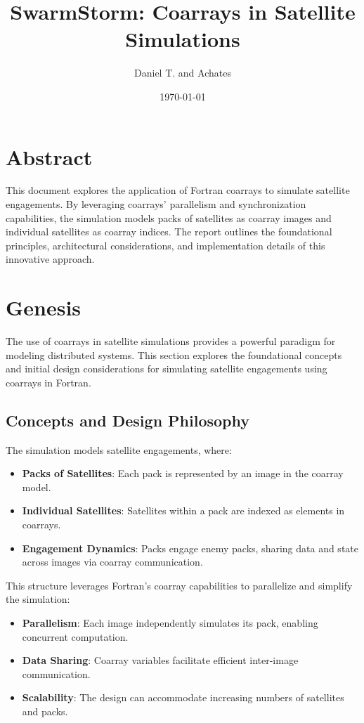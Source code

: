 \documentclass{article}
\title{SwarmStorm: Coarrays in Satellite Simulations}
\author{Daniel T. and Achates}
\date{\today}
\begin{document}
\maketitle

\section*{Abstract}
This document explores the application of Fortran coarrays to simulate satellite engagements. By leveraging coarrays' parallelism and synchronization capabilities, the simulation models packs of satellites as coarray images and individual satellites as coarray indices. The report outlines the foundational principles, architectural considerations, and implementation details of this innovative approach.

\section{Genesis}

The use of coarrays in satellite simulations provides a powerful paradigm for modeling distributed systems. This section explores the foundational concepts and initial design considerations for simulating satellite engagements using coarrays in Fortran.

\subsection{Concepts and Design Philosophy}

The simulation models satellite engagements, where:
\begin{itemize}
    \item \textbf{Packs of Satellites}: Each pack is represented by an image in the coarray model.
    \item \textbf{Individual Satellites}: Satellites within a pack are indexed as elements in coarrays.
    \item \textbf{Engagement Dynamics}: Packs engage enemy packs, sharing data and state across images via coarray communication.
\end{itemize}

This structure leverages Fortran’s coarray capabilities to parallelize and simplify the simulation:
\begin{itemize}
    \item \textbf{Parallelism}: Each image independently simulates its pack, enabling concurrent computation.
    \item \textbf{Data Sharing}: Coarray variables facilitate efficient inter-image communication.
    \item \textbf{Scalability}: The design can accommodate increasing numbers of satellites and packs.
\end{itemize}
\end{document}

